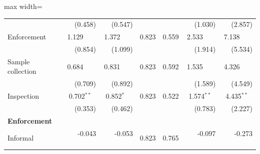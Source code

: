 \begin{table}[htbp]
{\begin{adjustbox}{max width=\linewidth}
\begin{tabular}{lrrrrrr}
 & (\phantom{-}0.458)\phantom{$^{***}$} & (\phantom{-}0.547)\phantom{$^{***}$} &  &  & (\phantom{-}\phantom{0}1.030)\phantom{$^{***}$} & (\phantom{-}\phantom{0}2.857)\phantom{$^{***}$} \\
Enforcement & \phantom{(}\phantom{-}1.129$^{\phantom{*}\phantom{*}\phantom{*}}$ & \phantom{(}\phantom{-}1.372$^{\phantom{*}\phantom{*}\phantom{*}}$ & \phantom{(}\phantom{-}0.823\phantom{$^{***}$} & \phantom{(}\phantom{-}0.559\phantom{$^{***}$} & \phantom{(}\phantom{-}\phantom{0}2.533$^{\phantom{*}\phantom{*}\phantom{*}}$ & \phantom{(}\phantom{-}\phantom{0}7.138$^{\phantom{*}\phantom{*}\phantom{*}}$ \\
 & (\phantom{-}0.854)\phantom{$^{***}$} & (\phantom{-}1.099)\phantom{$^{***}$} &  &  & (\phantom{-}\phantom{0}1.914)\phantom{$^{***}$} & (\phantom{-}\phantom{0}5.534)\phantom{$^{***}$} \\
Sample collection & \phantom{(}\phantom{-}0.684$^{\phantom{*}\phantom{*}\phantom{*}}$ & \phantom{(}\phantom{-}0.831$^{\phantom{*}\phantom{*}\phantom{*}}$ & \phantom{(}\phantom{-}0.823\phantom{$^{***}$} & \phantom{(}\phantom{-}0.592\phantom{$^{***}$} & \phantom{(}\phantom{-}\phantom{0}1.535$^{\phantom{*}\phantom{*}\phantom{*}}$ & \phantom{(}\phantom{-}\phantom{0}4.326$^{\phantom{*}\phantom{*}\phantom{*}}$ \\
 & (\phantom{-}0.709)\phantom{$^{***}$} & (\phantom{-}0.892)\phantom{$^{***}$} &  &  & (\phantom{-}\phantom{0}1.589)\phantom{$^{***}$} & (\phantom{-}\phantom{0}4.549)\phantom{$^{***}$} \\
Inspection & \phantom{(}\phantom{-}0.702$^{**\phantom{*}}$ & \phantom{(}\phantom{-}0.852$^{*\phantom{*}\phantom{*}}$ & \phantom{(}\phantom{-}0.823\phantom{$^{***}$} & \phantom{(}\phantom{-}0.522\phantom{$^{***}$} & \phantom{(}\phantom{-}\phantom{0}1.574$^{**\phantom{*}}$ & \phantom{(}\phantom{-}\phantom{0}4.435$^{**\phantom{*}}$ \\
 & (\phantom{-}0.353)\phantom{$^{***}$} & (\phantom{-}0.462)\phantom{$^{***}$} &  &  & (\phantom{-}\phantom{0}0.783)\phantom{$^{***}$} & (\phantom{-}\phantom{0}2.227)\phantom{$^{***}$} \\
\multicolumn{7}{l}{\textbf{Enforcement}} \\
Informal & \phantom{(}-0.043$^{\phantom{*}\phantom{*}\phantom{*}}$ & \phantom{(}-0.053$^{\phantom{*}\phantom{*}\phantom{*}}$ & \phantom{(}\phantom{-}0.823\phantom{$^{***}$} & \phantom{(}\phantom{-}0.765\phantom{$^{***}$} & \phantom{(}-\phantom{0}0.097$^{\phantom{*}\phantom{*}\phantom{*}}$ & \phantom{(}-\phantom{0}0.273$^{\phantom{*}\phantom{*}\phantom{*}}$ \\

\end{tabular}
\end{adjustbox}}
\end{table}
